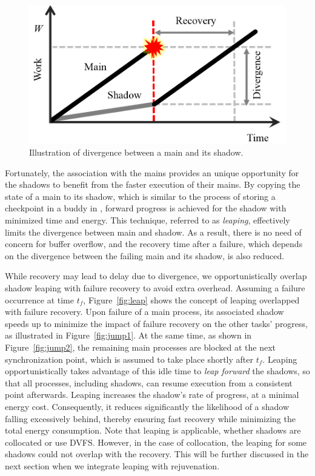 \begin{figure}[!h]
	\begin{center}
			\includegraphics[width=\columnwidth]{Figures/divergence}
	\end{center}
	\caption{Illustration of divergence between a main and its shadow.}
	\label{fig:divergence}
\end{figure}
 
Fortunately, the association with the mains provides an unique opportunity for the shadows to benefit from the faster execution of their mains. By copying the state of a main to its shadow, which is similar to the process of storing a checkpoint in a buddy in \cite{zheng_2004_ftccharm}, forward progress is achieved for the shadow with minimized time and energy. This technique, referred to as \textit{leaping}, effectively limits the divergence between main and shadow. 
As a result, there is no need of concern for buffer overflow, and the recovery time after a failure, which depends on the divergence between the failing main 
and its shadow, is also reduced. 


While recovery may lead to delay due to divergence, we opportunistically overlap shadow leaping with failure recovery to avoid extra overhead. 
Assuming a failure occurrence at time $t_f$, Figure~\ref{fig:leap} shows the concept of leaping overlapped with failure recovery. 
Upon failure of a main process, its associated shadow speeds up to minimize the impact of failure recovery on the other tasks' progress, as illustrated in Figure~\ref{fig:jump1}. 
At the same time, as shown in Figure~\ref{fig:jump2}, the remaining main processes are blocked
at the next synchronization point, which is assumed to take
place shortly after $t_f$. 
Leaping opportunistically takes advantage of this idle time to {\it leap forward} the shadows, so that  
all processes, including shadows, can resume execution from a consistent point afterwards. 
Leaping increases the shadow's rate of progress, at a minimal energy cost. Consequently, it reduces significantly the likelihood of a shadow falling excessively behind, thereby ensuring fast recovery while minimizing the total energy consumption. Note that leaping is applicable, whether shadows are collocated or use DVFS. However, in the case of collocation, the leaping for some shadows could not overlap with the recovery. This will be further discussed in the next section when we integrate leaping with rejuvenation.  


